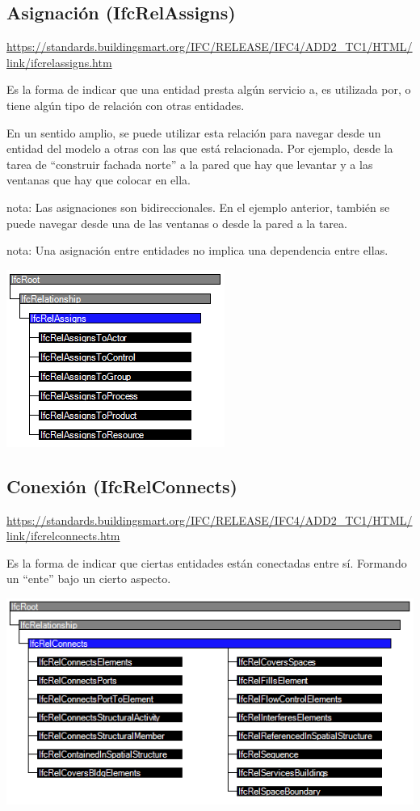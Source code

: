 \documentclass[spanish,12pt,a4paper,final,oneside]{book}
\begin{document}
\subsection{Asignación (IfcRelAssigns)}
\url{https://standards.buildingsmart.org/IFC/RELEASE/IFC4/ADD2_TC1/HTML/link/ifcrelassigns.htm}

Es la forma de indicar que una entidad presta algún servicio a, es utilizada por, o tiene algún tipo de relación con otras entidades.

En un sentido amplio, se puede utilizar esta relación para navegar desde un entidad del modelo a otras con las que está relacionada. Por ejemplo, desde la tarea de ``construir fachada norte'' a la pared que hay que levantar y a las ventanas que hay que colocar en ella.

nota: Las asignaciones son bidireccionales. En el ejemplo anterior, también se puede navegar desde una de las ventanas o desde la pared a la tarea.

nota: Una asignación entre entidades no implica una dependencia entre ellas.

\includegraphics[scale=1]{jerarquia de IfcRelAssigns}


\subsection{Conexión (IfcRelConnects)}
\url{https://standards.buildingsmart.org/IFC/RELEASE/IFC4/ADD2_TC1/HTML/link/ifcrelconnects.htm}

Es la forma de indicar que ciertas entidades están conectadas entre sí.   Formando un ``ente'' bajo un cierto aspecto.

\includegraphics[width=\textwidth]{jerarquia de IfcRelConnects}
\end{document}
